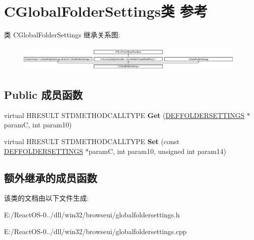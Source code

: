 \hypertarget{class_c_global_folder_settings}{}\section{C\+Global\+Folder\+Settings类 参考}
\label{class_c_global_folder_settings}
类 C\+Global\+Folder\+Settings 继承关系图\+:\begin{figure}[H]
\begin{center}
\leavevmode
\includegraphics[height=1.305361cm]{class_c_global_folder_settings}
\end{center}
\end{figure}
\subsection*{Public 成员函数}
\begin{DoxyCompactItemize}
\item 
\mbox{\label{class_c_global_folder_settings_aedd8ae787d83ec62b71ba260fb992c02}} 
virtual H\+R\+E\+S\+U\+LT S\+T\+D\+M\+E\+T\+H\+O\+D\+C\+A\+L\+L\+T\+Y\+PE {\bfseries Get} (\hyperlink{struct_d_e_f_f_o_l_d_e_r_s_e_t_t_i_n_g_s}{D\+E\+F\+F\+O\+L\+D\+E\+R\+S\+E\+T\+T\+I\+N\+GS} $\ast$paramC, int param10)
\item 
\mbox{\label{class_c_global_folder_settings_a181e17adca98a6e476c7221dcb51a744}} 
virtual H\+R\+E\+S\+U\+LT S\+T\+D\+M\+E\+T\+H\+O\+D\+C\+A\+L\+L\+T\+Y\+PE {\bfseries Set} (const \hyperlink{struct_d_e_f_f_o_l_d_e_r_s_e_t_t_i_n_g_s}{D\+E\+F\+F\+O\+L\+D\+E\+R\+S\+E\+T\+T\+I\+N\+GS} $\ast$paramC, int param10, unsigned int param14)
\end{DoxyCompactItemize}
\subsection*{额外继承的成员函数}


该类的文档由以下文件生成\+:\begin{DoxyCompactItemize}
\item 
E\+:/\+React\+O\+S-\/0../dll/win32/browseui/globalfoldersettings.\+h\item 
E\+:/\+React\+O\+S-\/0../dll/win32/browseui/globalfoldersettings.\+cpp\end{DoxyCompactItemize}
